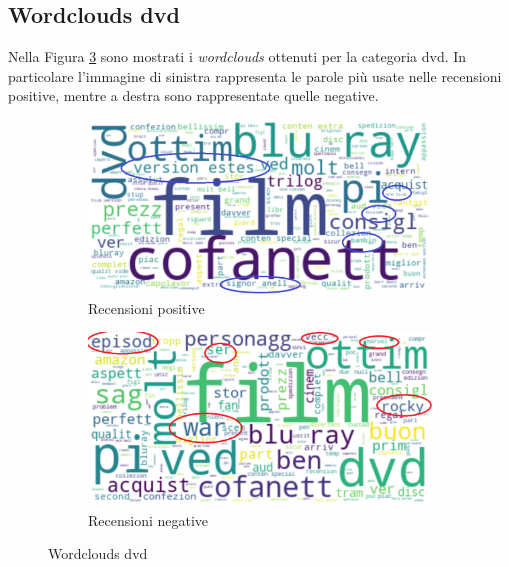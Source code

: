 			
			\subsection{Wordclouds dvd}
				Nella Figura \ref{fig:wordclouds_dvd} sono mostrati i \textit{wordclouds} ottenuti per la categoria dvd. In particolare l'immagine di sinistra rappresenta le parole più usate nelle recensioni positive, mentre a destra sono rappresentate quelle negative. 
					
				\begin{figure} [h]
					\centering
					\begin{subfigure}{0.48\textwidth}
						\includegraphics[width=\textwidth]{Figure/top_positive_dvd}
						\caption{Recensioni positive}
						\label{fig:top_positive_dvd}
					\end{subfigure}
					\begin{subfigure}{0.48\textwidth}
						\includegraphics[width=\textwidth]{Figure/top_negative_dvd}
						\caption{Recensioni negative}
						\label{fig:top_negative_dvd}
					\end{subfigure}
					\caption{Wordclouds dvd}\label{fig:wordclouds_dvd}
				\end{figure}
			

